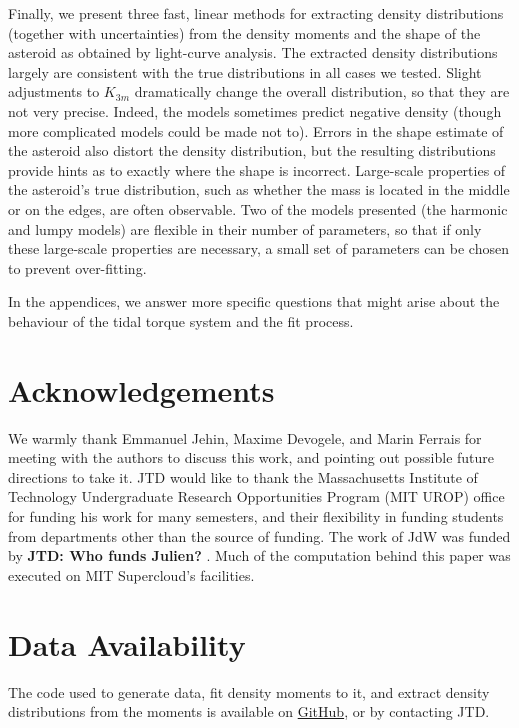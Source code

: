 \documentclass[fleqn,usenatbib]{mnras}
\newcommand{\jtd}[1]{ {\bf{\color{red} JTD: #1}} }
\begin{document}
Finally, we present three fast, linear methods for extracting density distributions (together with uncertainties) from the density moments and the shape of the asteroid as obtained by light-curve analysis. The extracted density distributions largely are consistent with the true distributions in all cases we tested. Slight adjustments to $K_{3m}$ dramatically change the overall distribution, so that they are not very precise. Indeed, the models sometimes predict negative density (though more complicated models could be made not to). Errors in the shape estimate of the asteroid also distort the density distribution, but the resulting distributions provide hints as to exactly where the shape is incorrect. Large-scale properties of the asteroid's true distribution, such as whether the mass is located in the middle or on the edges, are often observable. Two of the models presented (the harmonic and lumpy models) are flexible in their number of parameters, so that if only these large-scale properties are necessary, a small set of parameters can be chosen to prevent over-fitting.

In the appendices, we answer more specific questions that might arise about the behaviour of the tidal torque system and the fit process.

\section*{Acknowledgements}

We warmly thank Emmanuel Jehin, Maxime Devogele, and Marin Ferrais for meeting with the authors to discuss this work, and pointing out possible future directions to take it. JTD would like to thank the Massachusetts Institute of Technology Undergraduate Research Opportunities Program (MIT UROP) office for funding his work for many semesters, and their flexibility in funding students from departments other than the source of funding. The work of JdW was funded by \jtd{Who funds Julien?}. Much of the computation behind this paper was executed on MIT Supercloud's facilities.



\section*{Data Availability}

The code used to generate data, fit density moments to it, and extract density distributions from the moments is available on \href{https://github.com/jack-dinsmore/asteroid-tidal-torque}{GitHub}, or by contacting JTD.
\end{document}
